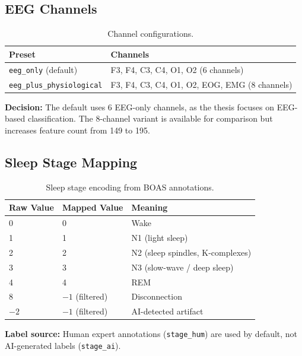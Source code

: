 \subsection{EEG Channels}

\begin{table}[h]
\centering
\caption{Channel configurations.}
\label{tab:channels}
\begin{tabular}{l l}
\toprule
\textbf{Preset} & \textbf{Channels} \\
\midrule
\texttt{eeg\_only} (default)          & F3, F4, C3, C4, O1, O2 (6 channels) \\
\texttt{eeg\_plus\_physiological}     & F3, F4, C3, C4, O1, O2, EOG, EMG (8 channels) \\
\bottomrule
\end{tabular}
\end{table}

\textbf{Decision:} The default uses 6 EEG-only channels, as the thesis focuses on EEG-based classification. The 8-channel variant is available for comparison but increases feature count from 149 to 195.

\subsection{Sleep Stage Mapping}

\begin{table}[h]
\centering
\caption{Sleep stage encoding from BOAS annotations.}
\label{tab:stage_mapping}
\begin{tabular}{l l l}
\toprule
\textbf{Raw Value} & \textbf{Mapped Value} & \textbf{Meaning} \\
\midrule
0  & 0  & Wake \\
1  & 1  & N1 (light sleep) \\
2  & 2  & N2 (sleep spindles, K-complexes) \\
3  & 3  & N3 (slow-wave / deep sleep) \\
4  & 4  & REM \\
8  & $-1$ (filtered) & Disconnection \\
$-2$ & $-1$ (filtered) & AI-detected artifact \\
\bottomrule
\end{tabular}
\end{table}

\textbf{Label source:} Human expert annotations (\texttt{stage\_hum}) are used by default, not AI-generated labels (\texttt{stage\_ai}).

